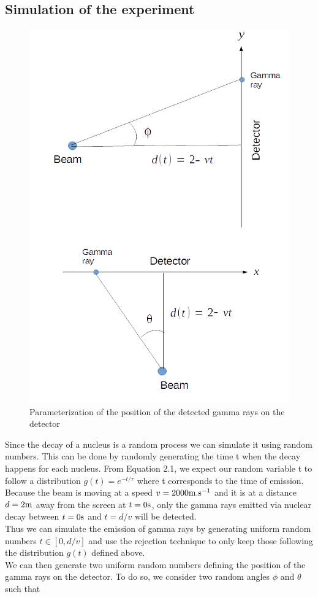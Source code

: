\documentclass[10 pt]{article}
\numberwithin{equation}{section}
\begin{document}
\begin{multicols}{2}

\subsection{Simulation of the experiment}

\begin{figure}[H]
\includegraphics[width=0.7\linewidth]{Parametrisation}
\caption{Parameterization of the position of the detected gamma rays on the detector}
\end{figure}

Since the decay of a nucleus is a random process we can simulate it using random numbers. This can be done by randomly generating the time t when the decay happens for each nucleus. From Equation 2.1, we expect our random variable t to follow a distribution $g(t) = e^{-t/\tau}$ where t corresponds to the time of emission. Because the beam is moving at a speed $v = 2000 \rm m.s^{-1}$ and it is at a distance $d = 2\rm m$ away from the screen at $t=0\rm s$, only the gamma rays emitted via nuclear decay between $t=0\rm s$ and $t = d/v$ will be detected.\\
Thus we can simulate the emission of gamma rays by generating uniform random numbers $t \in [0, d/v]$ and use the rejection technique to only keep those following the distribution $g(t)$ defined above.\\
We can then generate two uniform random numbers defining the position of the gamma rays on the detector. To do so, we consider two random angles $\phi$ and $\theta$ such that


\end{multicols}
\end{document}
